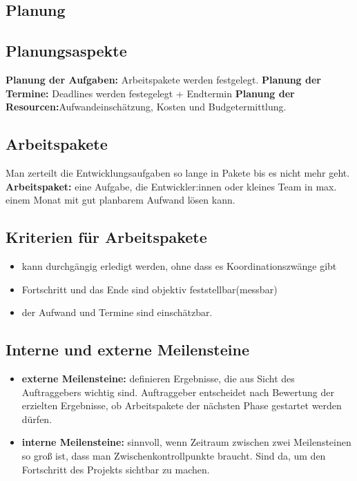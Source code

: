 \documentclass{book}
\begin{document}
    \subsection{Planung}
    \subsection{Planungsaspekte}
    \textbf{Planung der Aufgaben:} Arbeitspakete werden festgelegt. \newline
    \textbf{Planung der Termine:} Deadlines werden festegelegt + Endtermin \newline
    \textbf{Planung der Resourcen:}Aufwandeinschätzung, Kosten und Budgetermittlung.

    \subsection{Arbeitspakete}
    Man zerteilt die Entwicklungsaufgaben so lange in Pakete bis es nicht mehr geht. \newline
    \textbf{Arbeitspaket:} eine Aufgabe, die Entwickler:innen oder kleines Team in max. einem Monat mit gut planbarem Aufwand lösen kann.

    \subsection{Kriterien für Arbeitspakete}
    \begin{itemize}
        \item kann durchgängig erledigt werden, ohne dass es Koordinationszwänge gibt
        \item Fortschritt und das Ende sind objektiv feststellbar(messbar)
        \item der Aufwand und Termine sind einschätzbar.

    \end{itemize}
    \subsection{Interne und externe Meilensteine}
    \begin{itemize}
        \item \textbf{externe Meilensteine:} definieren Ergebnisse, die aus Sicht des Auftraggebers wichtig sind. Auftraggeber entscheidet nach Bewertung der erzielten Ergebnisse, ob Arbeitspakete der nächsten Phase gestartet werden dürfen.
        \item \textbf{interne Meilensteine:} sinnvoll, wenn Zeitraum zwischen zwei Meilensteinen so groß ist, dass man Zwischenkontrollpunkte braucht. Sind da, um den Fortschritt des Projekts sichtbar zu machen.
    \end{itemize}
    \clearpage
\end{document}

